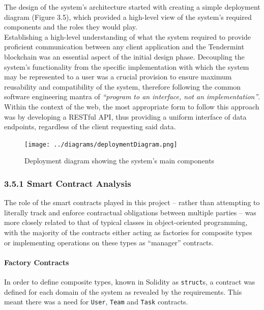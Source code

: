\documentclass[12pt]{report}
\let\oldparagraph\paragraph
\renewcommand{\paragraph}[1]{\oldparagraph{#1}\mbox{}}
\begin{document}
The design of the system's architecture started with creating a simple
deployment diagram (Figure 3.5), which provided a high-level view of
the system's required components and the roles they would play.\\
Establishing a high-level understanding of what the system required to
provide proficient communication between any client application and the
Tendermint blockchain was an essential aspect of the initial design
phase. Decoupling the system's functionality from the specific
implementation with which the system may be represented to a user was a
crucial provision to ensure maximum reusability and compatibility of the
system, therefore following the common software engineering mantra of
\emph{``program to an interface, not an implementation''}\cite{1programtointerface}.
Within the context of the web, the most appropriate form to follow this
approach was by developing a RESTful\cite{1rest} API, thus providing a
uniform interface of data endpoints, regardless of the client requesting
said data.

\begin{figure}[htbp]
\centering
\texttt{[image: ../diagrams/deploymentDiagram.png]}
\caption{Deployment diagram showing the system's main components}
\end{figure}

\subsubsection{3.5.1 Smart Contract
Analysis}\label{smart-contract-analysis}

The role of the smart contracts played in this project -- rather than
attempting to literally track and enforce contractual obligations
between multiple parties -- was more closely related to that of typical
classes in object-oriented programming, with the
majority of the contracts either acting as
factories\cite{gamma1995design} for composite types or implementing
operations on these types as ``manager'' contracts.

\paragraph{Factory Contracts}\label{factory-contracts}

In order to define composite types, known in Solidity as
\texttt{struct}s, a contract was defined for each domain of the system
as revealed by the requirements. This meant there was a need for
\texttt{User}, \texttt{Team} and \texttt{Task} contracts.
\end{document}
